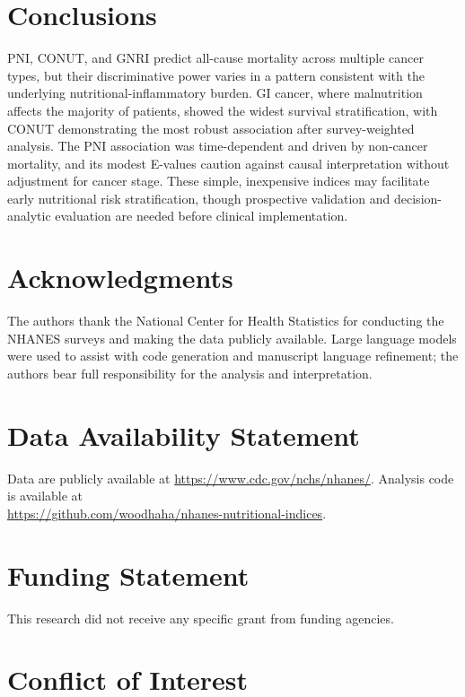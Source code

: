 \documentclass[review]{elsarticle}
\begin{document}
\section{Conclusions}

PNI, CONUT, and GNRI predict all-cause mortality across multiple cancer types, but their discriminative power varies in a pattern consistent with the underlying nutritional-inflammatory burden. GI cancer, where malnutrition affects the majority of patients, showed the widest survival stratification, with CONUT demonstrating the most robust association after survey-weighted analysis. The PNI association was time-dependent and driven by non-cancer mortality, and its modest E-values caution against causal interpretation without adjustment for cancer stage. These simple, inexpensive indices may facilitate early nutritional risk stratification, though prospective validation and decision-analytic evaluation are needed before clinical implementation.

\section*{Acknowledgments}

The authors thank the National Center for Health Statistics for conducting the NHANES surveys and making the data publicly available. Large language models were used to assist with code generation and manuscript language refinement; the authors bear full responsibility for the analysis and interpretation.

\section*{Data Availability Statement}

Data are publicly available at \url{https://www.cdc.gov/nchs/nhanes/}. Analysis code is available at\\ \url{https://github.com/woodhaha/nhanes-nutritional-indices}.

\section*{Funding Statement}

This research did not receive any specific grant from funding agencies.

\section*{Conflict of Interest}
\end{document}
